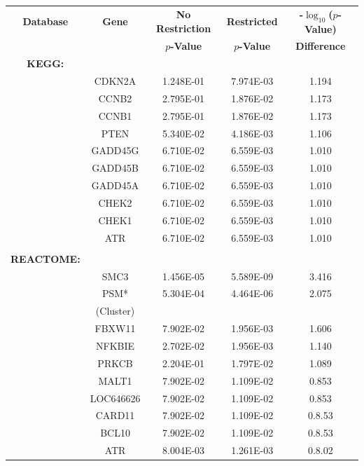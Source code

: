\documentclass[12pt, a4paper]{article}
\begin{document}
\setlength{\footskip}{2cm}
\begin{table}[ht]
\centering
\begin{tabular}{ccccc}
  \hline
  \textbf{Database} & \textbf{Gene} & \textbf{No Restriction} & \textbf{Restricted} & \textbf{-$\log_{10}$($p$-Value)} \\
  & & \textbf{$p$-Value} & \textbf{$p$-Value} & \textbf{Difference} \\
  \hline
  \textbf{KEGG:} & & & & \\
  & CDKN2A & 1.248E-01 & 7.974E-03 & 1.194 \\
  & CCNB2 & 2.795E-01 & 1.876E-02 & 1.173 \\
  & CCNB1 & 2.795E-01 & 1.876E-02 & 1.173 \\
  & PTEN & 5.340E-02 & 4.186E-03 & 1.106 \\
  & GADD45G & 6.710E-02 & 6.559E-03 & 1.010 \\
  & GADD45B & 6.710E-02 & 6.559E-03 & 1.010 \\
  & GADD45A & 6.710E-02 & 6.559E-03 & 1.010 \\
  & CHEK2 & 6.710E-02 & 6.559E-03 & 1.010 \\
  & CHEK1 & 6.710E-02 & 6.559E-03 & 1.010 \\
  & ATR & 6.710E-02 & 6.559E-03 & 1.010 \\
  \\
  \textbf{REACTOME:} & & & & \\ 
  & SMC3 & 1.456E-05 & 5.589E-09 & 3.416 \\
  & PSM* & 5.304E-04 & 4.464E-06 & 2.075 \\
  & (Cluster) & & & \\ 
  & FBXW11 & 7.902E-02 & 1.956E-03 & 1.606 \\
  & NFKBIE & 2.702E-02 & 1.956E-03 & 1.140 \\
  & PRKCB & 2.204E-01 & 1.797E-02 & 1.089 \\
  & MALT1 & 7.902E-02 & 1.109E-02 & 0.853 \\
  & LOC646626 & 7.902E-02 & 1.109E-02 & 0.853 \\
  & CARD11 & 7.902E-02 & 1.109E-02 & 0.8.53 \\
  & BCL10 & 7.902E-02 & 1.109E-02 & 0.8.53 \\
  & ATR & 8.004E-03 & 1.261E-03 & 0.8.02 \\
   \hline
\end{tabular}

\end{table}
\end{document}
